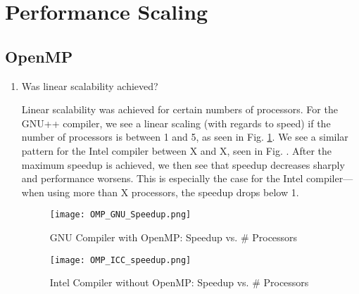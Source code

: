 \documentclass{article}
\begin{document}

\section{Performance Scaling}
\subsection{OpenMP}
\begin{enumerate}
	\item Was linear scalability achieved?

	Linear scalability was achieved for certain numbers of processors. For the GNU++ compiler, we see a linear scaling (with regards to speed) if the number of processors is between 1 and 5, as seen in Fig. \ref{fig:gnu_omp_speedup}. We see a similar pattern for the Intel compiler between X and X, seen in Fig. . After the maximum speedup is achieved, we then see that speedup decreases sharply and performance worsens. This is especially the case for the Intel compiler---when using more than X processors, the speedup drops below 1. 

	\begin{figure}[h!] %
	 	\begin{center}
	 		\texttt{[image: OMP\_GNU\_Speedup.png]} %
	 		\caption{GNU Compiler with OpenMP: Speedup vs. \# Processors}
	 		\label{fig:gnu_omp_speedup}
	 	\end{center}
	\end{figure}

	\begin{figure}[h!] %
	 	\begin{center}
	 		\texttt{[image: OMP\_ICC\_speedup.png]} %
	 		\caption{Intel Compiler without OpenMP: Speedup vs. \# Processors}
	 		\label{fig:gnu_icc_speedup}
	 	\end{center}
	\end{figure}


\end{enumerate}
\end{document}
